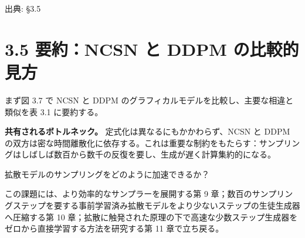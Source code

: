 

{\color{gray}\footnotesize 出典: §3.5\par}
\vspace{0.2em}
\section*{3.5 要約：NCSN と DDPM の比較的見方}



まず図 3.7 で NCSN と DDPM のグラフィカルモデルを比較し、主要な相違と類似を表 3.1 に要約する。



\textbf{共有されるボトルネック。} 定式化は異なるにもかかわらず、NCSN と DDPM の双方は密な時間離散化に依存する。これは重要な制約をもたらす：サンプリングはしばしば数百から数千の反復を要し、生成が遅く計算集約的になる。

\begin{propositionbox}[問い 3.5.1]
拡散モデルのサンプリングをどのように加速できるか？
\end{propositionbox}


この課題には、より効率的なサンプラーを展開する第 9 章；数百のサンプリングステップを要する事前学習済み拡散モデルをより少ないステップの生徒生成器へ圧縮する第 10 章；拡散に触発された原理の下で高速な少数ステップ生成器をゼロから直接学習する方法を研究する第 11 章で立ち戻る。

